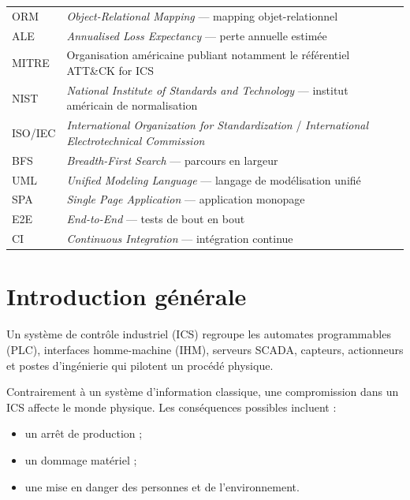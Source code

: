 \documentclass[12pt,a4paper]{article}
\newcommand{\forcereset}[1]{}
\begin{document}
\begin{footnotesize}
\begin{tabularx}{\textwidth}{p{2.6cm} X}
ORM & \emph{Object-Relational Mapping} --- mapping objet-relationnel \\
ALE & \emph{Annualised Loss Expectancy} --- perte annuelle estimée \\
MITRE & Organisation américaine publiant notamment le référentiel ATT\&CK for ICS \\
NIST & \emph{National Institute of Standards and Technology} --- institut américain de normalisation \\
ISO/IEC & \emph{International Organization for Standardization} / \emph{International Electrotechnical Commission} \\
BFS & \emph{Breadth-First Search} --- parcours en largeur \\
UML & \emph{Unified Modeling Language} --- langage de modélisation unifié \\
SPA & \emph{Single Page Application} --- application monopage \\
E2E & \emph{End-to-End} --- tests de bout en bout \\
CI & \emph{Continuous Integration} --- intégration continue \\
\bottomrule
\end{tabularx}
\end{footnotesize}

\pagestyle{fancy}

\tableofcontents
\newpage
\listoffigures
\newpage

\section{Introduction générale}
\forcereset{8}

Un système de contrôle industriel (ICS) regroupe les automates programmables (PLC), interfaces homme-machine (IHM), serveurs SCADA, capteurs, actionneurs et postes d'ingénierie qui pilotent un procédé physique.

Contrairement à un système d'information classique, une compromission dans un ICS affecte le monde physique. Les conséquences possibles incluent :
\begin{itemize}
    \item un arrêt de production ;
    \item un dommage matériel ;
    \item une mise en danger des personnes et de l'environnement.
\end{itemize}
\end{document}
